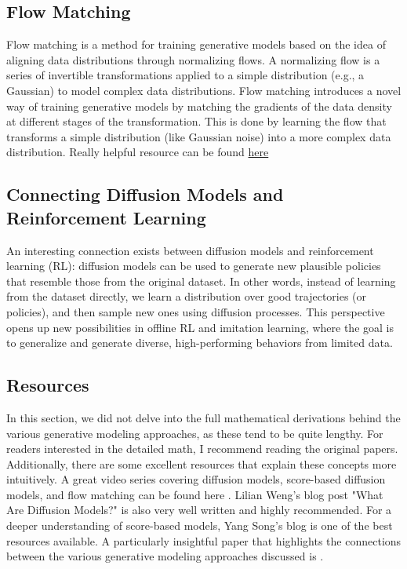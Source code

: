 \subsection{Flow Matching}
Flow matching \cite{lipman2023flowmatchinggenerativemodeling} is a method for training generative models based on 
the idea of aligning data distributions through normalizing flows. A normalizing flow is a series of invertible
transformations applied to a simple distribution (e.g., a Gaussian) to model complex data distributions.\newline
Flow matching introduces a novel way of training generative models by matching the gradients of the data density 
at different stages of the transformation. This is done by learning the flow that transforms a simple distribution 
(like Gaussian noise) into a more complex data distribution.
Really helpful resource can be found \href{https://www.youtube.com/watch?v=7cMzfkWFWhI}{here}


\subsection{Connecting Diffusion Models and Reinforcement Learning}
An interesting connection exists between diffusion models and reinforcement learning (RL): diffusion models can be used to 
generate new plausible policies that resemble those from the original dataset. In other words, instead of learning from the 
dataset directly, we learn a distribution over good trajectories (or policies), and then sample new ones using diffusion 
processes. This perspective opens up new possibilities in offline RL and imitation learning, where the goal is to generalize 
and generate diverse, high-performing behaviors from limited data.

\subsection{Resources}
In this section, we did not delve into the full mathematical derivations behind the various generative modeling approaches, as 
these tend to be quite lengthy. For readers interested in the detailed math, I recommend reading the original papers. 
Additionally, there are some excellent resources that explain these concepts more intuitively. A great video series covering 
diffusion models, score-based diffusion models, and flow matching can be found here \cite{outlier}. Lilian Weng’s blog post "What 
Are Diffusion Models?" \cite{weng2021diffusion} is also very well written and highly recommended. For a deeper understanding of 
score-based models, Yang Song’s blog \cite{YangSong} is one of the best resources available. A particularly insightful paper that 
highlights the connections between the various generative modeling approaches discussed is \cite{luo2022understandingdiffusionmodelsunified}.

